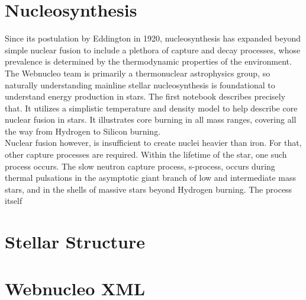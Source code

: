 \documentclass{article}
\begin{document}
\section*{Nucleosynthesis}

Since its postulation by Eddington in 1920, nucleosynthesis has expanded beyond simple nuclear fusion to include a plethora of 
capture and decay processes, whose prevalence is determined by the thermodynamic properties of the environment. The Webnucleo team 
is primarily a thermonuclear astrophysics group, so naturally understanding mainline stellar nucleosynthesis is foundational to 
understand energy production in stars. The first notebook describes precisely that. It utilizes a simplistic temperature and density 
model to help describe core nuclear fusion in stars. It illustrates core burning in all mass ranges, covering all the way from 
Hydrogen to Silicon burning.\\

Nuclear fusion however, is insufficient to create nuclei heavier than iron. For that, other capture processes are required. Within 
the lifetime of the star, one such process occurs. The slow neutron capture process, s-process, occurs during thermal pulsations in 
the asymptotic giant branch of low and intermediate mass stars, and in the shells of massive stars beyond Hydrogen burning. 
The process itself 


\section*{Stellar Structure}

\section*{Webnucleo XML}
\end{document}
